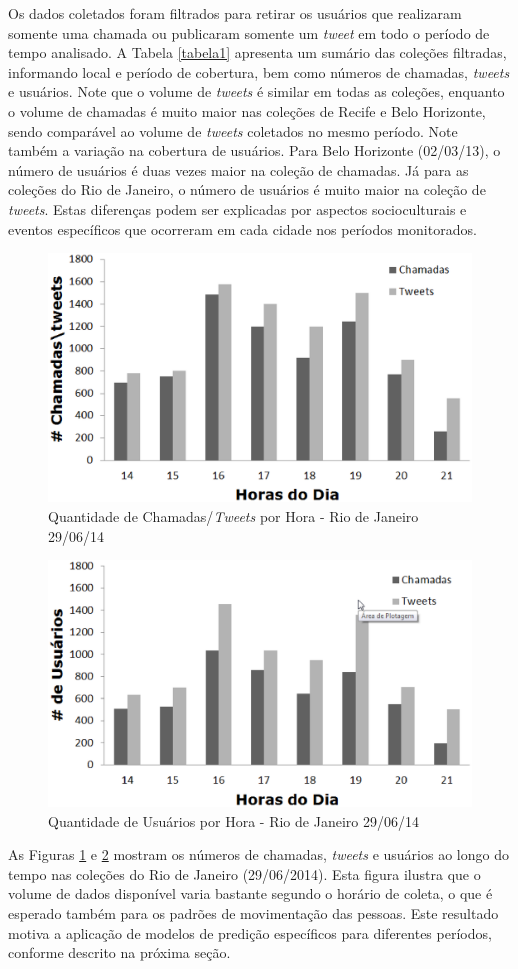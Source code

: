 \documentclass[10pt, a4paper, onecolumn, conference, compsocconf]{IEEEtran}
\begin{document}
Os dados coletados foram filtrados para retirar os usuários que realizaram somente uma chamada ou publicaram somente um \textit{tweet} em todo o período de tempo analisado. 
A Tabela \ref{tabela1}  apresenta um sumário das coleções filtradas, informando local e período de cobertura, bem como números de chamadas, {\it tweets} e usuários.  Note que o volume de {\it tweets} é similar em todas as coleções, enquanto o volume de chamadas é muito maior nas coleções de Recife e Belo Horizonte, sendo comparável ao volume de {\it tweets} coletados no mesmo período.   Note também a variação na cobertura de usuários. Para  Belo Horizonte (02/03/13),  o número de usuários  é duas vezes maior na coleção de chamadas. Já para as coleções do Rio de Janeiro, o número de usuários é muito maior na coleção de {\it tweets}. Estas diferenças podem ser explicadas por aspectos socioculturais e eventos específicos que ocorreram em cada cidade nos períodos monitorados. 

\begin{figure}[ttt!]
\centering
\includegraphics[width=0.5\linewidth]{Graficos/CallsTweets-Rio29-06-14.eps}
\caption{Quantidade de Chamadas/\textit{Tweets} por Hora - Rio de Janeiro 29/06/14}
\label{fig:qtdrio29a}
\end{figure}

\begin{figure}[ttt!]
\centering
\includegraphics[width=0.5\linewidth]{Graficos/Users-Rio29-06-14.eps}
\caption{Quantidade de Usuários por Hora - Rio de Janeiro 29/06/14}
\label{fig:qtdrio29b}
\end{figure}




As Figuras \ref{fig:qtdrio29a} e \ref{fig:qtdrio29b} mostram os números de chamadas, {\it tweets} e usuários ao longo do tempo nas coleções do Rio de Janeiro (29/06/2014). Esta figura ilustra que o volume de dados disponível varia bastante segundo o horário de coleta, o que é esperado também para os padrões de movimentação das pessoas. Este resultado motiva a aplicação de modelos de predição específicos para diferentes períodos, conforme descrito na próxima seção.
\end{document}
